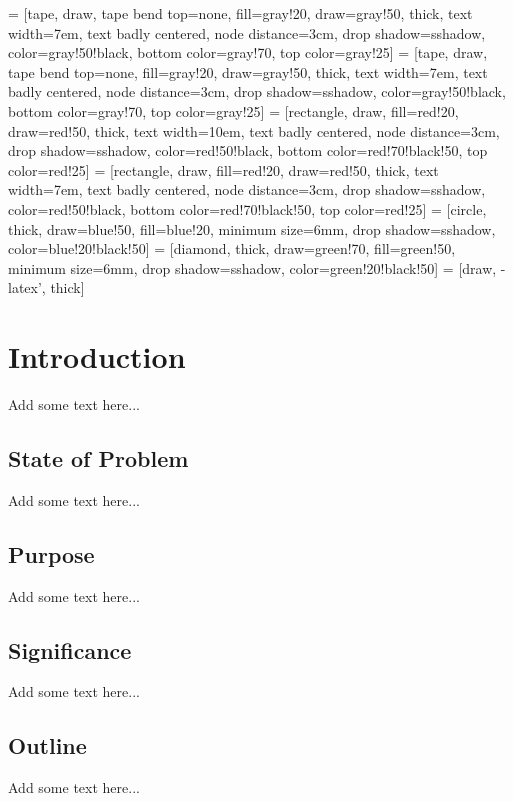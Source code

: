 

 = [tape, draw, tape bend top=none, fill=gray!20, draw=gray!50, thick, 
    text width=7em, text badly centered, node distance=3cm, drop shadow={sshadow, color=gray!50!black},
    bottom color=gray!70, top color=gray!25]
 = [tape, draw, tape bend top=none, fill=gray!20, draw=gray!50, thick,
    text width=7em, text badly centered, node distance=3cm, drop shadow={sshadow, color=gray!50!black},
    bottom color=gray!70, top color=gray!25]
 = [rectangle, draw, fill=red!20, draw=red!50, thick,
    text width=10em, text badly centered, node distance=3cm, drop shadow={sshadow, color=red!50!black},
    bottom color=red!70!black!50, top color=red!25]
 = [rectangle, draw, fill=red!20, draw=red!50, thick,
    text width=7em, text badly centered, node distance=3cm, drop shadow={sshadow, color=red!50!black},
    bottom color=red!70!black!50, top color=red!25]
 = [circle, thick, draw=blue!50, fill=blue!20, minimum size=6mm,
    drop shadow={sshadow, color=blue!20!black!50}]
 = [diamond, thick, draw=green!70, fill=green!50, minimum size=6mm,
    drop shadow={sshadow, color=green!20!black!50}]
 = [draw, -latex', thick]

\chapter{Introduction}
\label{sec:intro_description}
Add some text here... 
\section{State of Problem}
Add some text here... 
\section{Purpose}
Add some text here... 
\section{Significance}
Add some text here... 
\section{Outline}
Add some text here... 

